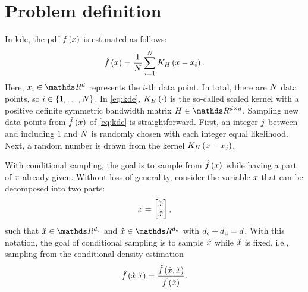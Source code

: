 \section{Problem definition}
\label{sec:problem}

In \ac{kde}, the \ac{pdf} $f\left( x \right)$ is estimated as follows:
\begin{equation}
	\label{eq:kde}
	\hat{f}\left( x \right) = 
	\frac{1}{N} \sum_{i=1}^{N} 
	K_{H} \left( x - x_{i} \right).
\end{equation}
Here, $\datapoint{\indexdata} \in \realnumbers^{\dimension}$ represents the $i$-th data point.
In total, there are $N$ data points, so $i \in \{1, \ldots, N\}$.
In \cref{eq:kde}, $K_{H} \left( \cdot \right)$ is the so-called scaled kernel with a positive definite symmetric bandwidth matrix $\bandwidthmatrix \in \realnumbers^{\dimension \times \dimension}$.
Sampling new data points from $\hat{f}\left( x \right)$ of \cref{eq:kde} is straightforward.
First, an integer $j$ between and including $1$ and $N$ is randomly chosen with each integer equal likelihood. 
Next, a random number is drawn from the kernel $K_{H} \left( x - x_{j} \right)$.

With conditional sampling, the goal is to sample from $\hat{f}\left( x \right)$ while having a part of $x$ already given. 
Without loss of generality, consider the variable $x$ that can be decomposed into two parts:
\begin{equation}
	\label{eq:decomposition}
	x = \begin{bmatrix}
		\breve{x} \\ \hat{x}
	\end{bmatrix},
\end{equation}
such that $\variableparta \in \realnumbers^{\dimensionparta}$ and $\variablepartb \in \realnumbers^{\dimensionpartb}$ with $d_\mathrm{c} + d_\mathrm{u} = d$.
With this notation, the goal of conditional sampling is to sample $\hat{x}$ while $\breve{x}$ is fixed, i.e., sampling from the conditional density estimation
\begin{equation}
	\label{eq:conditional density}
	\hat{f}\left(  \hat{x} | \breve{x}  \right)
	= \frac{\hat{f}\left( \hat{x}, \breve{x} \right)}{\hat{f}\left( \breve{x} \right)}.
\end{equation}

